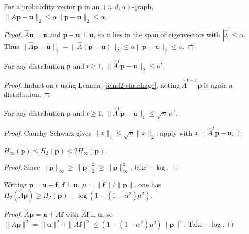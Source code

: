 \begin{lemma}
  \label{lem:l2-shrinkage}
  For a probability vector $\mathbf p$ in an $(n,d,\alpha)$-graph,
  $\|\hat A\mathbf p-\mathbf u\|_2\le\alpha\|\mathbf p-\mathbf u\|_2\le\alpha$.
\end{lemma}
\begin{proof}
  $\hat A\mathbf u=\mathbf u$ and $\mathbf p-\mathbf u\perp\mathbf u$, so it lies
  in the span of eigenvectors with $|\hat\lambda|\le\alpha$. Thus
  $\|\hat A\mathbf p-\mathbf u\|_2=\|\hat A(\mathbf p-\mathbf u)\|_2
  \le\alpha\|\mathbf p-\mathbf u\|_2\le\alpha$.
\end{proof}

\begin{theorem}
  \label{thm:l2-convergence}
  For any distribution $\mathbf p$ and $t\ge1$,
  $\|\hat A^t\mathbf p-\mathbf u\|_2\le\alpha^t$.
\end{theorem}
\begin{proof}
  Induct on $t$ using Lemma~\ref{lem:l2-shrinkage}, noting $\hat A^{t-1}\mathbf p$
  is again a distribution.
\end{proof}

\begin{theorem}
  \label{thm:l1-convergence}
  For any distribution $\mathbf p$ and $t\ge1$,
  $\|\hat A^t\mathbf p-\mathbf u\|_1\le\sqrt n\,\alpha^t$.
\end{theorem}
\begin{proof}
  Cauchy--Schwarz gives $\|x\|_1\le\sqrt n\|x\|_2$; apply with
  $x=\hat A^t\mathbf p-\mathbf u$.
\end{proof}

\begin{proposition}
  \label{prop:entropy-ordering}
  $H_\infty(\mathbf p)\le H_2(\mathbf p)\le2H_\infty(\mathbf p)$.
\end{proposition}
\begin{proof}
  Since $\|\mathbf p\|_\infty\ge\|\mathbf p\|_2^2\ge\|\mathbf p\|_\infty^2$, take
  $-\log$.
\end{proof}

\begin{theorem}
  \label{thm:renyi-increase}
  Writing $\mathbf p=\mathbf u+\mathbf f$, $\mathbf f\perp\mathbf u$,
  $\mu=\|\mathbf f\|/\|\mathbf p\|$, one has
  $H_2(\hat A\mathbf p)\ge H_2(\mathbf p)-\log(1-(1-\alpha^2)\mu^2)$.
\end{theorem}
\begin{proof}
  $\hat A\mathbf p=\mathbf u+\hat A\mathbf f$ with $\hat A\mathbf f\perp\mathbf u$,
  so $\|\hat A\mathbf p\|^2=\|\mathbf u\|^2+\|\hat A\mathbf f\|^2
  \le(1-(1-\alpha^2)\mu^2)\|\mathbf p\|^2$. Take $-\log$.
\end{proof}

